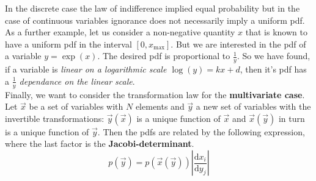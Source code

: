 \documentclass[12pt, a4paper]{scrartcl}
\begin{document}
In the discrete case the law of indifference implied equal probability but in the
case of continuous variables ignorance does not necessarily imply a uniform pdf.
As a further example, let us consider a non-negative quantity $x$ that is known
to have a uniform pdf in the interval $[0,x_{\text{max}}]$. But we are interested in the
pdf of a variable $y=\exp(x)$. The desired pdf is proportional
to $\frac{1}{y}$. So we have found, if a variable is \textit{linear on a logarithmic scale $\log(y)=kx+d$}, 
then it's pdf has a \textit{$\frac 1y$ dependance on the linear scale}.\\

Finally, we want to consider the transformation law for the \textbf{multivariate case}.
Let $\vec{x}$ be a set of variables with $N$ elements and $\vec{y}$ a new set of variables with the invertible transformations: 
$\vec{y}(\vec{x})$ is a unique function of $\vec{x}$ and $\vec{x}(\vec{y})$ in turn is a unique function of $\vec{y}$. Then the pdfs are related by the following expression, where the last factor is the \textbf{Jacobi-determinant}.\\
\begin{equation*}\boxed{p(\vec{y})=p(\vec{x}(\vec{y}))\left|\frac{\text{d}x_i}{\text{d}y_j}\right|
}\end{equation*}\\

\\
\end{document}
